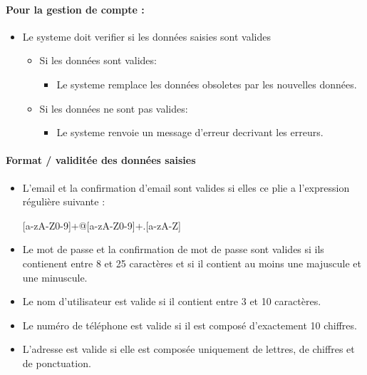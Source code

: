 \documentclass{article}
\begin{document}
\paragraph{Pour la gestion de compte : }
\begin{itemize}
\item Le systeme doit verifier si les données saisies sont valides
	\begin{itemize}
	\item Si les données sont valides:
		\begin{itemize}
		\item Le systeme remplace les données obsoletes par les nouvelles données.
		\end{itemize}
		\item Si les données ne sont pas valides:
		\begin{itemize}
		\item Le systeme renvoie un message d'erreur decrivant les erreurs.
		\end{itemize}
	\end{itemize}
\end{itemize}

\paragraph{Format / validitée des données saisies}
\begin{itemize}
\item L'email  et la confirmation d'email sont valides si elles ce plie a l'expression régulière
  suivante : 

[a-zA-Z0-9]+@[a-zA-Z0-9]+.[a-zA-Z]

\item Le mot de passe et la confirmation de mot de passe sont valides si ils contienent entre 8 et 25
  caractères et si il contient au moins une majuscule et une minuscule.

\item Le nom d'utilisateur est valide si il contient entre 3 et 10
  caractères.

\item Le numéro de téléphone est valide si il est composé d'exactement
  10 chiffres.

\item L'adresse est valide si elle est composée uniquement de lettres,
  de chiffres et de ponctuation. 
\end{itemize}
\end{document}
